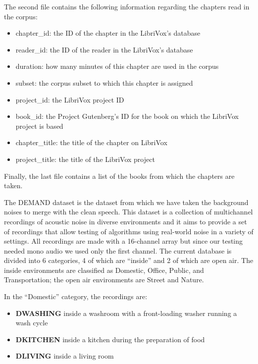 \documentclass[../main.tex]{subfiles}
\begin{document}
The second file contains the following information regarding the chapters read in the corpus:

\begin{itemize}
    \item chapter\_id: the ID of the chapter in the LibriVox's database
    \item reader\_id: the ID of the reader in the LibriVox's database
    \item duration: how many minutes of this chapter are used in the corpus
    \item subset: the corpus subset to which this chapter is assigned
    \item project\_id: the LibriVox project ID
    \item book\_id: the Project Gutenberg's ID for the book on which the LibriVox project is based
    \item chapter\_title: the title of the chapter on LibriVox
    \item project\_title: the title of the LibriVox project
\end{itemize}

Finally, the last file contains a list of the books from which the chapters are taken.

The DEMAND dataset is the dataset from which we have taken the background noises to merge with the clean speech. This dataset is a collection of multichannel recordings of acoustic noise in diverse environments and it aims to provide a set of recordings that allow testing of algorithms using real-world noise in a variety of settings. All recordings are made with a 16-channel array but since our testing needed mono audio we used only the first channel. The current database is divided into 6 categories, 4 of which are “inside” and 2 of which are open air.
The inside environments are classified as Domestic, Office, Public, and Transportation; the open air environments are Street and Nature.

In the “Domestic” category, the recordings are:

\begin{itemize}
    \item \textbf{DWASHING} inside a washroom with a front-loading washer running a wash cycle
    \item \textbf{DKITCHEN} inside a kitchen during the preparation of food
    \item \textbf{DLIVING} inside a living room
\end{itemize}
\end{document}
